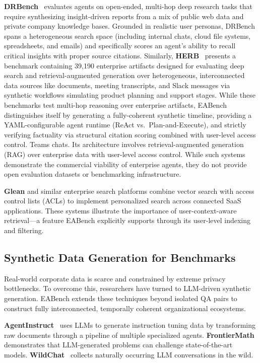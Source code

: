 \documentclass[journal,dvipsnames]{acmart}
\begin{document}
\textbf{DRBench}~\cite{abaskohi2025drbench} evaluates agents on open-ended, multi-hop deep research tasks that require synthesizing insight-driven reports from a mix of public web data and private company knowledge bases. Grounded in realistic user personas, DRBench spans a heterogeneous search space (including internal chats, cloud file systems, spreadsheets, and emails) and specifically scores an agent's ability to recall critical insights with proper source citations. 
    Similarly, \textbf{HERB}~\cite{choubey2025benchmarking} presents a benchmark containing 39,190 enterprise artifacts designed for evaluating deep search and retrieval-augmented generation over heterogeneous, interconnected data sources like documents, meeting transcripts, and Slack messages via synthetic workflows simulating product planning and support stages. While these benchmarks test multi-hop reasoning over enterprise artifacts, EABench distinguishes itself by generating a fully-coherent synthetic timeline, providing a YAML-configurable agent runtime (ReAct vs.\ Plan-and-Execute), and strictly verifying factuality via structural citation scoring combined with user-level access control.
Teams chats.  Its architecture involves retrieval-augmented generation (RAG)
over enterprise data with user-level access control.  While such systems
demonstrate the commercial viability of enterprise agents, they do not provide
open evaluation datasets or benchmarking infrastructure.

\textbf{Glean} and similar enterprise search platforms combine vector search
with access control lists (ACLs) to implement personalized search across
connected SaaS applications.  These systems illustrate the importance of
user-context-aware retrieval---a feature EABench explicitly supports through
its user-level indexing and filtering.

\subsection{Synthetic Data Generation for Benchmarks}

Real-world corporate data is scarce and constrained by extreme privacy bottlenecks. To overcome this, researchers have turned to LLM-driven synthetic generation. EABench extends these techniques beyond isolated QA pairs to construct fully interconnected, temporally coherent organizational ecosystems.

\textbf{AgentInstruct}~\cite{mitra2024agentinstruct} uses LLMs to generate
instruction tuning data by transforming raw documents through a pipeline of
multiple specialized agents.
\textbf{FrontierMath}~\cite{glazer2024frontiermath} demonstrates that
LLM-generated problems can challenge state-of-the-art models.
\textbf{WildChat}~\cite{zhao2024wildchat} collects naturally occurring LLM
conversations in the wild.
\end{document}
